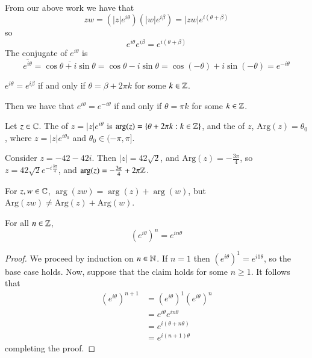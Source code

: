 \documentclass[12pt, a4paper, oneside, openright, titlepage]{book}
\begin{document}
From our above work we have that \begin{equation*}
    zw = (|z|e^{i\theta})(|w|e^{i\beta}) = |zw|e^{i(\theta+\beta)}
\end{equation*}
so \begin{equation*}
    e^{i\theta}e^{i\beta} = e^{i(\theta+\beta)}
\end{equation*}
The conjugate of $e^{i\theta}$ is \begin{equation*}
    \overline{e^{i\theta}} = \overline{\cos\theta+i\sin\theta} = \cos\theta-i\sin\theta=\cos(-\theta)+i\sin(-\theta) = e^{-i\theta}
\end{equation*}


\begin{prop}
    $e^{i\theta} = e^{i\beta}$ if and only if $\theta = \beta + 2\pi k$ for some $k \in \mathbb Z$.
\end{prop}

Then we have that $e^{i\theta} = e^{-i\theta}$ if and only if $\theta = \pi k$ for some $k \in \mathbb Z$.

\begin{defn}
    Let $z \in \mathbb C$. The  of $z = |z|e^{i\theta}$ is $\arg(z) = \{\theta+2\pi k:k \in \mathbb Z\}$, and the  of $z$, $\text{Arg}(z) = \theta_0$, where $z = |z|e^{i\theta_0}$ and $\theta_0 \in (-\pi,\pi]$.
\end{defn}


\begin{eg}
    Consider $z = -42-42i$. Then $|z| = 42\sqrt{2}$, and $\text{Arg}(z) = -\frac{3\pi}{4}$, so $z = 42\sqrt{2}e^{-i\frac{3\pi}{4}}$, and $\arg(z) = -\frac{3\pi}{4} + 2\pi\mathbb Z$.
\end{eg}

\begin{props}
    For $z,w \in \mathbb C$, $\arg(zw) = \arg(z)+\arg(w)$, but $\text{Arg}(zw) \neq \text{Arg}(z)+\text{Arg}(w)$.
\end{props}

\begin{thm} \label{thm:DeMoivre}
    For all $n \in \mathbb Z$, \begin{equation*}
        (e^{i\theta})^n = e^{in\theta}
    \end{equation*}
\end{thm}
\begin{proof}
    We proceed by induction on $n \in \mathbb N$. If $n=1$ then $(e^{i\theta})^1 = e^{i1\theta}$, so the base case holds. Now, suppose that the claim holds for some $n \geq 1$. It follows that \begin{align*}
        (e^{i\theta})^{n+1} &= (e^{i\theta})^1(e^{i\theta})^n \\ 
        &= e^{i\theta}e^{in\theta} \tag{by I.H} \\
        &= e^{i(\theta+n\theta)} \\
        &= e^{i(n+1)\theta}
    \end{align*}
    completing the proof.
\end{proof}
\end{document}
